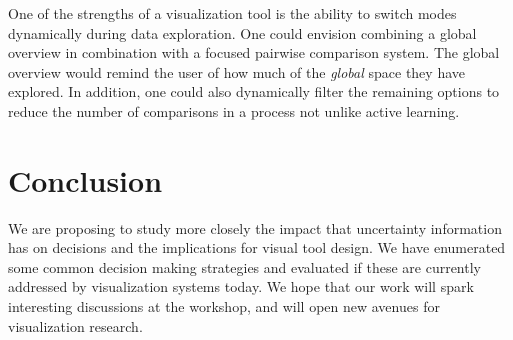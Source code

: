 One of the strengths of a visualization tool is the ability to switch modes
dynamically during data exploration. One could envision combining a
global overview in combination with a focused pairwise comparison system.
The global overview would remind the user of how much of the \emph{global}
space they have explored. In addition, one could also dynamically filter
the remaining options to reduce the number of comparisons in a process
not unlike active learning.





\section{Conclusion}

We are proposing to study more closely the impact that uncertainty information
has on decisions and the implications for visual tool design. 
We have enumerated some common decision making strategies and evaluated
if these are currently addressed by visualization systems today. We hope that our work
will spark interesting discussions at the workshop, and will open new avenues
for visualization research. 

